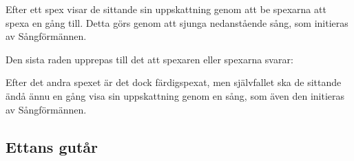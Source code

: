 \newpage

Efter ett spex visar de sittande sin uppskattning genom att be spexarna att spexa en gång till.
Detta görs genom att sjunga nedanstående sång, som initieras av Sångförmännen.
\\


Den sista raden upprepas till det att spexaren eller spexarna svarar:
\\


Efter det andra spexet är det dock färdigspexat, men självfallet ska de sittande 
ändå ännu en gång visa sin uppskattning genom en sång, som även den initieras av Sångförmännen.
\\

\subsection*{Ettans gutår}


\newpage




